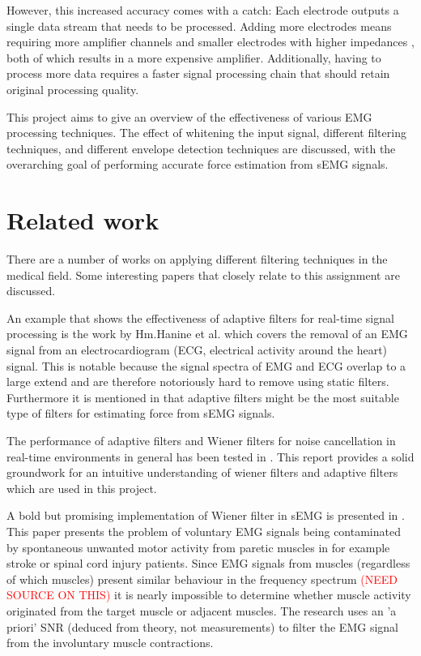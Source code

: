 However, this increased accuracy comes with a catch: Each electrode outputs a single data stream that needs to be processed. Adding more electrodes means requiring more amplifier channels and smaller electrodes with higher impedances \cite{electrode_size_impedance}, both of which results in a more expensive amplifier. Additionally, having to process more data requires a faster signal processing chain that should retain original processing quality.


This project aims to give an overview of the effectiveness of various EMG processing techniques. The effect of whitening the input signal, different filtering techniques, and different envelope detection techniques are discussed, with the overarching goal of performing accurate force estimation from sEMG signals.

\section{Related work}
There are a number of works on applying different filtering techniques in the medical field. Some interesting papers that closely relate to this assignment are discussed.

An example that shows the effectiveness of adaptive filters for real-time signal processing is the work by Hm.Hanine et al. \cite{adaptive_filter_emg_noise_cancellation_ecg} which covers the removal of an EMG signal from an electrocardiogram (ECG, electrical activity around the heart) signal. This is notable because the signal spectra of EMG and ECG overlap to a large extend and are therefore notoriously hard to remove using static filters. Furthermore it is mentioned in \cite{influence_semg_amplitude_estimation_technique_on_emg_force_relationship} that adaptive filters might be the most suitable type of filters for estimating force from sEMG signals.

The performance of adaptive filters and Wiener filters for noise cancellation in real-time environments in general has been tested in \cite{wiener_vs_adaptive_realtime_noisecancellation}. This report provides a solid groundwork for an intuitive understanding of wiener filters and adaptive filters which are used in this project.

A bold but promising implementation of Wiener filter in sEMG is presented in \cite{wiener_filter_a_priori_semg}. This paper presents the problem of voluntary EMG signals being contaminated by spontaneous unwanted motor activity from paretic muscles in for example stroke or spinal cord injury patients. Since EMG signals from muscles (regardless of which muscles) present similar behaviour in the frequency spectrum \textcolor{red}{(NEED SOURCE ON THIS)} it is nearly impossible to determine whether muscle activity originated from the target muscle or adjacent muscles. The research uses an 'a priori' SNR (deduced from theory, not measurements) to filter the EMG signal from the involuntary muscle contractions. 


